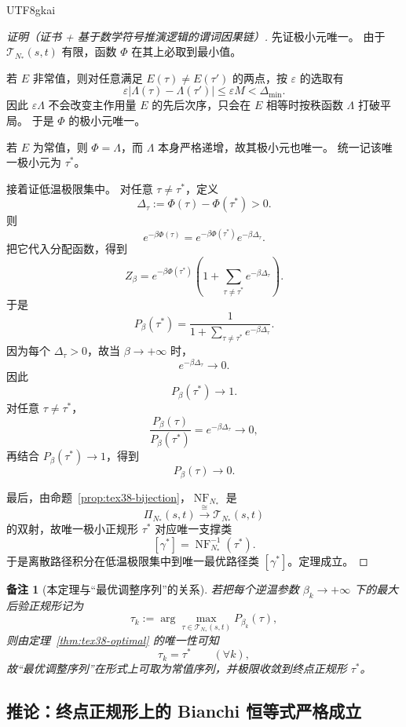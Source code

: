 \documentclass[12pt]{article}
\newtheorem{remark}{备注}[section]
\newcommand{\NF}{\operatorname{NF}}
\begin{document}
\begin{CJK*}{UTF8}{gkai}
\begin{proof}[证明（证书 + 基于数学符号推演逻辑的谓词因果链）]
先证极小元唯一。
由于 $\mathcal{T}_{N_\ast}(s,t)$ 有限，函数 $\Phi$ 在其上必取到最小值。

若 $E$ 非常值，则对任意满足 $E(\tau)\neq E(\tau')$ 的两点，按 $\varepsilon$ 的选取有
\[
  \varepsilon |\Lambda(\tau)-\Lambda(\tau')|
  \le
  \varepsilon M
  <
  \Delta_{\min}.
\]
因此 $\varepsilon \Lambda$ 不会改变主作用量 $E$ 的先后次序，只会在 $E$ 相等时按秩函数 $\Lambda$ 打破平局。
于是 $\Phi$ 的极小元唯一。

若 $E$ 为常值，则 $\Phi=\Lambda$，而 $\Lambda$ 本身严格递增，故其极小元也唯一。
统一记该唯一极小元为 $\tau^\ast$。

接着证低温极限集中。
对任意 $\tau\neq\tau^\ast$，定义
\[
  \Delta_\tau:=\Phi(\tau)-\Phi(\tau^\ast)>0.
\]
则
\[
  e^{-\beta\Phi(\tau)}
  =
  e^{-\beta\Phi(\tau^\ast)}e^{-\beta\Delta_\tau}.
\]
把它代入分配函数，得到
\[
  Z_\beta
  =
  e^{-\beta\Phi(\tau^\ast)}
  \left(
    1+\sum_{\tau\neq\tau^\ast}e^{-\beta\Delta_\tau}
  \right).
\]
于是
\[
  P_\beta(\tau^\ast)
  =
  \frac{1}
       {1+\sum_{\tau\neq\tau^\ast}e^{-\beta\Delta_\tau}}.
\]
因为每个 $\Delta_\tau>0$，故当 $\beta\to+\infty$ 时，
\[
  e^{-\beta\Delta_\tau}\to 0.
\]
因此
\[
  P_\beta(\tau^\ast)\to 1.
\]
对任意 $\tau\neq\tau^\ast$，
\[
  \frac{P_\beta(\tau)}{P_\beta(\tau^\ast)}
  =
  e^{-\beta\Delta_\tau}\to 0,
\]
再结合 $P_\beta(\tau^\ast)\to1$，得到
\[
  P_\beta(\tau)\to 0.
\]

最后，由命题~\ref{prop:tex38-bijection}，$\NF_{N_\ast}$ 是
\[
  \Pi_{N_\ast}(s,t)\xrightarrow{\cong}\mathcal{T}_{N_\ast}(s,t)
\]
的双射，故唯一极小正规形 $\tau^\ast$ 对应唯一支撑类
\[
  [\gamma^\ast]=\NF_{N_\ast}^{-1}(\tau^\ast).
\]
于是离散路径积分在低温极限集中到唯一最优路径类 $[\gamma^\ast]$。定理成立。
\end{proof}

\begin{remark}[本定理与“最优调整序列”的关系]
若把每个逆温参数 $\beta_k\to+\infty$ 下的最大后验正规形记为
\[
  \tau_k:=\arg\max_{\tau\in\mathcal{T}_{N_\ast}(s,t)}P_{\beta_k}(\tau),
\]
则由定理~\ref{thm:tex38-optimal} 的唯一性可知
\[
  \tau_k=\tau^\ast\qquad(\forall k),
\]
故“最优调整序列”在形式上可取为常值序列，并极限收敛到终点正规形 $\tau^\ast$。
\end{remark}

\subsection{推论：终点正规形上的 Bianchi 恒等式严格成立}
\label{sec:tex38-terminal}


\end{CJK*}
\end{document}
